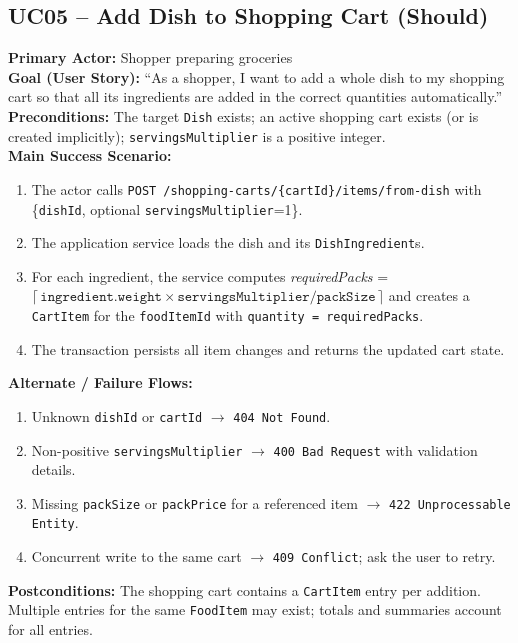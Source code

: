 \documentclass[11pt]{article}
\begin{document}
\subsection*{UC05 -- Add Dish to Shopping Cart (Should)}
\textbf{Primary Actor:} Shopper preparing groceries\\
\textbf{Goal (User Story):} ``As a shopper, I want to add a whole dish to my shopping cart so that all its ingredients are added in the correct quantities automatically.''\\
\textbf{Preconditions:} The target \texttt{Dish} exists; an active shopping cart exists (or is created implicitly); \texttt{servingsMultiplier} is a positive integer.\\
\textbf{Main Success Scenario:}
\begin{enumerate}[label=\arabic*.]
  \item The actor calls \texttt{POST /shopping-carts/\{cartId\}/items/from-dish} with \{\texttt{dishId}, optional \texttt{servingsMultiplier}=1\}.
  \item The application service loads the dish and its \texttt{DishIngredient}s.
  \item For each ingredient, the service computes \textit{requiredPacks} = \(\lceil\,\texttt{ingredient.weight} \times \texttt{servingsMultiplier} / \texttt{packSize}\,\rceil\) and creates a \texttt{CartItem} for the \texttt{foodItemId} with \texttt{quantity = requiredPacks}.
  \item The transaction persists all item changes and returns the updated cart state.
\end{enumerate}
\textbf{Alternate / Failure Flows:}
\begin{enumerate}[label=\arabic*F.]
  \item Unknown \texttt{dishId} or \texttt{cartId} $\rightarrow$ \texttt{404 Not Found}.
  \item Non-positive \texttt{servingsMultiplier} $\rightarrow$ \texttt{400 Bad Request} with validation details.
  \item Missing \texttt{packSize} or \texttt{packPrice} for a referenced item $\rightarrow$ \texttt{422 Unprocessable Entity}.
  \item Concurrent write to the same cart $\rightarrow$ \texttt{409 Conflict}; ask the user to retry.
\end{enumerate}
\textbf{Postconditions:} The shopping cart contains a \texttt{CartItem} entry per addition. Multiple entries for the same \texttt{FoodItem} may exist; totals and summaries account for all entries.\\
\end{document}
